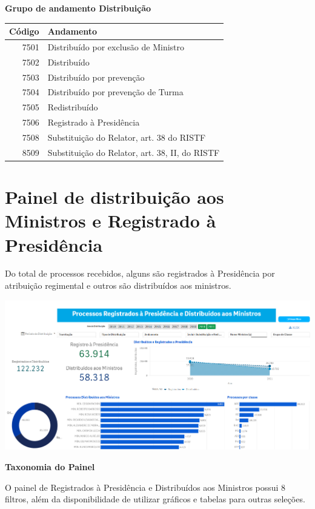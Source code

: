 \documentclass[
]{book}
\begin{document}
\textbf{Grupo de andamento Distribuição}

\begin{tabular}{r|l}
\hline
Código & Andamento\\
\hline
7501 & Distribuído por exclusão de Ministro\\
\hline
7502 & Distribuído\\
\hline
7503 & Distribuído por prevenção\\
\hline
7504 & Distribuído por prevenção de Turma\\
\hline
7505 & Redistribuído\\
\hline
7506 & Registrado à Presidência\\
\hline
7508 & Substituição do Relator, art. 38 do RISTF\\
\hline
8509 & Substituição do Relator, art. 38, II, do RISTF\\
\hline
\end{tabular}

\hypertarget{painel-de-distribuiuxe7uxe3o-aos-ministros-e-registrado-uxe0-presiduxeancia}{%
\section{Painel de distribuição aos Ministros e Registrado à Presidência}\label{painel-de-distribuiuxe7uxe3o-aos-ministros-e-registrado-uxe0-presiduxeancia}}

Do total de processos recebidos, alguns são registrados à Presidência por atribuição regimental e outros são distribuídos aos ministros.

\includegraphics[width=1\linewidth]{imagens/fig-cap6-1}

\textbf{Taxonomia do Painel}

O painel de Registrados à Presidência e Distribuídos aos Ministros possui 8 filtros, além da disponibilidade de utilizar gráficos e tabelas para outras seleções.
\end{document}
